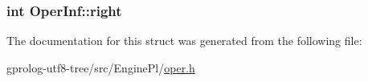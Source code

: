\subsubsection[{\texorpdfstring{right}{right}}]{\setlength{\rightskip}{0pt plus 5cm}int Oper\+Inf\+::right}\hypertarget{structOperInf_a558dc457885d6b96f6d8f833f1ce6c66}{}\label{structOperInf_a558dc457885d6b96f6d8f833f1ce6c66}


The documentation for this struct was generated from the following file\+:\begin{DoxyCompactItemize}
\item 
gprolog-\/utf8-\/tree/src/\+Engine\+Pl/\hyperlink{oper_8h}{oper.\+h}\end{DoxyCompactItemize}
